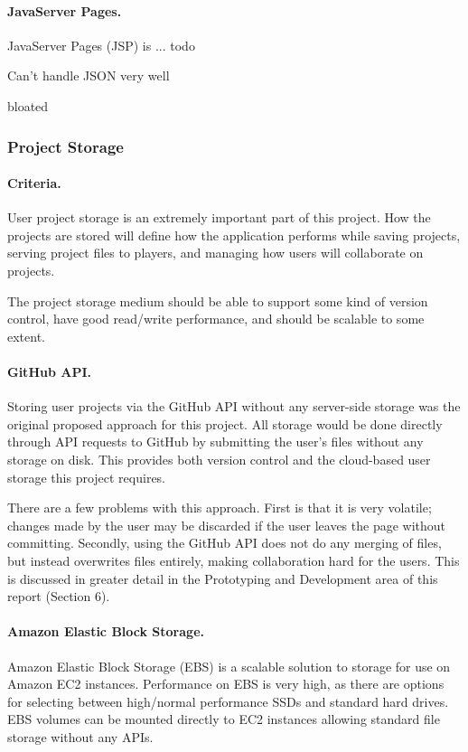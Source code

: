 \documentclass[a4paper, 12pt]{article}
\begin{document}
\paragraph{JavaServer Pages.}
JavaServer Pages (JSP) is ... todo


Can’t handle JSON very well

bloated



\subsubsection{Project Storage}
\paragraph{Criteria.}
User project storage is an extremely important part of this project. How the projects are stored will define how the application performs while saving projects, serving project files to players, and managing how users will collaborate on projects.

The project storage medium should be able to support some kind of version control, have good read/write performance, and should be scalable to some extent.

\paragraph{GitHub API.}
Storing user projects via the GitHub API without any server-side storage was the original proposed approach for this project. All storage would be done directly through API requests to GitHub by submitting the user's files without any storage on disk. This provides both version control and the cloud-based user storage this project requires.


There are a few problems with this approach. First is that it is very volatile; changes made by the user may be discarded if the user leaves the page without committing. Secondly, using the GitHub API does not do any merging of files, but instead overwrites files entirely, making collaboration hard for the users. This is discussed in greater detail in the Prototyping and Development area of this report (Section 6).


\paragraph{Amazon Elastic Block Storage.}
Amazon Elastic Block Storage (EBS) is a scalable solution to storage for use on Amazon EC2 instances. Performance on EBS is very high, as there are options for selecting between high/normal performance SSDs and standard hard drives. EBS volumes can be mounted directly to EC2 instances allowing standard file storage without any APIs.
\end{document}
